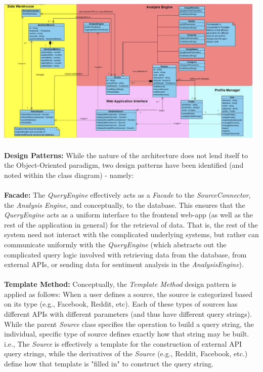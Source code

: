 \documentclass[12pt]{article}
\begin{document}
  \includegraphics[width=13cm]{../../Images/classDiagram.png}\\\\  
  \textbf{Design Patterns:} While the nature of the architecture does not lend itself to the Object-Oriented paradigm, two design patterns have been identified (and noted within the class diagram) - namely:\\\\
  \textbf{Facade:} The \textit{QueryEngine} effectively acts as a \textit{Facade} to the \textit{SourceConnector}, the \textit{Analysis Engine}, and conceptually, to the database. This ensures that the \textit{QueryEngine} acts as a uniform interface to the frontend web-app (as well as the rest of the application in general) for the retrieval of data. That is, the rest of the system need not interact with the complicated underlying systems, but rather can communicate uniformly with the \textit{QueryEngine} (which abstracts out the complicated query logic involved with retrieving data from the database, from external APIs, or sending data for sentiment analysis in the \textit{AnalysisEngine}).\\\\
  \textbf{Template Method:} Conceptually, the \textit{Template Method} design pattern is applied as follows: When a user defines a source, the source is categorized based on its type (e.g., Facebook, Reddit, etc). Each of these types of sources has different APIs with different parameters (and thus have different query strings). While the parent \textit{Source} class specifies the operation to build a query string, the individual, specific type of source defines exactly how that string may be built. i.e., The \textit{Source} is effectively a template for the construction of external API query strings, while the derivatives of the \textit{Source} (e.g., Reddit, Facebook, etc.) define how that template is "filled in" to construct the query string.
\end{document}

